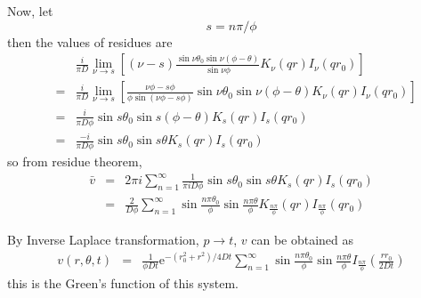 \documentclass{article}
\begin{document}
Now, let
\begin{equation}
    s = n\pi / \phi
\end{equation}
then the values of residues are
\begin{eqnarray}
    & & \frac{i}{\pi D}\lim_{\nu\to s}\left[
        (\nu - s)\frac{\sin\nu\theta_0\sin\nu(\phi - \theta)}{\sin\nu\phi}
        K_\nu(qr)I_\nu(qr_0)
        \right] \nonumber \\
    &=& \frac{i}{\pi D}\lim_{\nu\to s}\left[
        \frac{\nu\phi - s\phi}{\phi\sin(\nu\phi-s\phi)}
        \sin\nu\theta_0\sin\nu(\phi - \theta)
        K_\nu(qr)I_\nu(qr_0)
        \right] \nonumber \\
    &=& \frac{i}{\pi D\phi}\sin s\theta_0\sin s(\phi - \theta)K_s(qr)I_s(qr_0) \nonumber \\
    &=& \frac{-i}{\pi D\phi}\sin s\theta_0\sin s\theta K_s(qr)I_s(qr_0)
\end{eqnarray}
so from residue theorem,
\begin{eqnarray}
    \bar{v} &=& 2\pi i\sum_{n=1}^{\infty}
            \frac{1}{\pi iD\phi}\sin s\theta_0\sin s\theta K_s(qr)I_s(qr_0) \nonumber \\
            &=& \frac{2}{D\phi}\sum^{\infty}_{n=1}
            \sin\frac{n\pi\theta_0}{\phi}\sin\frac{n\pi\theta}{\phi}
                K_{\frac{n\pi}{\phi}}(qr)I_{\frac{n\pi}{\phi}}(qr_0)
\end{eqnarray}

By Inverse Laplace transformation, $p\to t$, $v$ can be obtained as
\begin{eqnarray}
    v(r, \theta, t) &=& \frac{1}{\phi Dt}\mathrm{e}^{-(r_0^2 + r^2)/4Dt}
          \sum^{\infty}_{n=1}\sin\frac{n\pi\theta_0}{\phi}\sin\frac{n\pi\theta}{\phi}
          I_{\frac{n\pi}{\phi}}\left(\frac{rr_0}{2Dt}\right)
\end{eqnarray}
this is the Green's function of this system.
\end{document}

